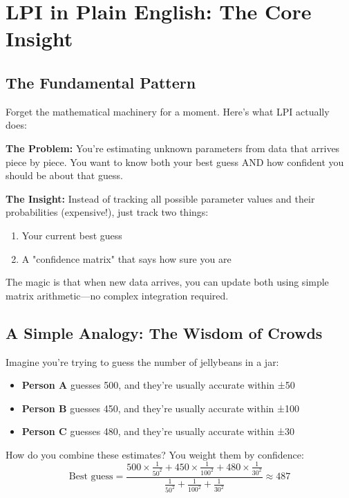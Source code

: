 \documentclass[11pt]{article}
\begin{document}
\section{LPI in Plain English: The Core Insight}

\subsection{The Fundamental Pattern}

Forget the mathematical machinery for a moment. Here's what LPI actually does:

\textbf{The Problem:} You're estimating unknown parameters from data that arrives piece by piece. You want to know both your best guess AND how confident you should be about that guess.

\textbf{The Insight:} Instead of tracking all possible parameter values and their probabilities (expensive!), just track two things:
\begin{enumerate}
\item Your current best guess
\item A "confidence matrix" that says how sure you are
\end{enumerate}

The magic is that when new data arrives, you can update both using simple matrix arithmetic—no complex integration required.

\subsection{A Simple Analogy: The Wisdom of Crowds}

Imagine you're trying to guess the number of jellybeans in a jar:

\begin{itemize}
\item \textbf{Person A} guesses 500, and they're usually accurate within ±50
\item \textbf{Person B} guesses 450, and they're usually accurate within ±100
\item \textbf{Person C} guesses 480, and they're usually accurate within ±30
\end{itemize}

How do you combine these estimates? You weight them by confidence:
\begin{equation*}
\text{Best guess} = \frac{500 \times \frac{1}{50^2} + 450 \times \frac{1}{100^2} + 480 \times \frac{1}{30^2}}{\frac{1}{50^2} + \frac{1}{100^2} + \frac{1}{30^2}} \approx 487
\end{equation*}
\end{document}
